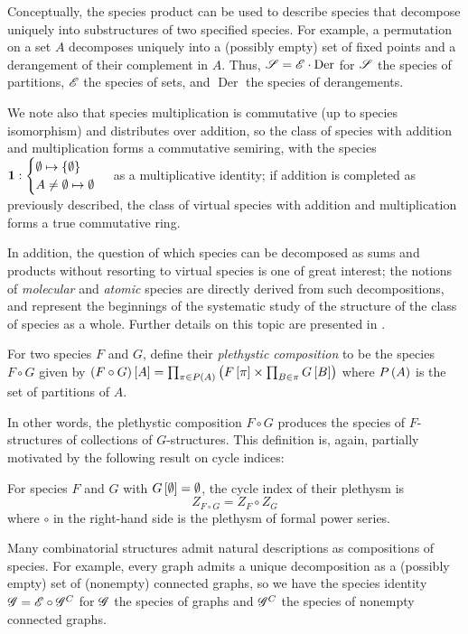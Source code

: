 \documentclass[sectionflow,singlespace,twoside]{brandiss} %
\numberwithin{section}{chapter}
\numberwithin{figure}{chapter}
\begin{document}
Conceptually, the species product can be used to describe species that decompose uniquely into substructures of two specified species.
For example, a permutation on a set $A$ decomposes uniquely into a (possibly empty) set of fixed points and a derangement of their complement in $A$.
Thus, $\mathscr{S} = \mathscr{E} \cdot \operatorname{Der}$ for $\mathscr{S}$ the species of partitions, $\mathscr{E}$ the species of sets, and $\operatorname{Der}$ the species of derangements.

We note also that species multiplication is commutative (up to species isomorphism) and distributes over addition, so the class of species with addition and multiplication forms a commutative semiring, with the species $\mathbf{1}: \begin{cases} \emptyset \mapsto \left\{ {\emptyset} \right\} \\ A \neq \emptyset \mapsto \emptyset \end{cases}$ as a multiplicative identity; if addition is completed as previously described, the class of virtual species with addition and multiplication forms a true commutative ring.

In addition, the question of which species can be decomposed as sums and products without resorting to virtual species is one of great interest; the notions of \emph{molecular} and \emph{atomic} species are directly derived from such decompositions, and represent the beginnings of the systematic study of the structure of the class of species as a whole.
Further details on this topic are presented in \cite[\S 2.6]{bll:species}.

\begin{definition}
  \label{def:speccomp}
  For two species $F$ and $G$, define their \emph{plethystic composition} to be the species $F \circ G$ given by $\left( {F \circ G} \right) \left[ {A} \right] = \prod_{\pi \in P \left( {A} \right)} \left( {F \left[ {\pi} \right] \times \prod_{B \in \pi} G \left[ {B} \right]} \right)$ where $P \left( {A} \right)$ is the set of partitions of $A$.
\end{definition}
In other words, the plethystic composition $F \circ G$ produces the species of $F$-structures of collections of $G$-structures. This definition is, again, partially motivated by the following result on cycle indices:
\begin{theorem}
  \label{thm:speccompci}
  For species $F$ and $G$ with $G \left[ {\emptyset} \right] = \emptyset$, the cycle index of their plethysm is
  \begin{equation}
    \label{eq:speccompci}
    Z_{F \circ G} = Z_{F} \circ Z_{G}
  \end{equation}
  where $\circ$ in the right-hand side is the plethysm of formal power series.
\end{theorem}
Many combinatorial structures admit natural descriptions as compositions of species.
For example, every graph admits a unique decomposition as a (possibly empty) set of (nonempty) connected graphs, so we have the species identity $\mathscr{G} = \mathscr{E} \circ \mathscr{G}^{C}$ for $\mathscr{G}$ the species of graphs and $\mathscr{G}^{C}$ the species of nonempty connected graphs.
\end{document}
